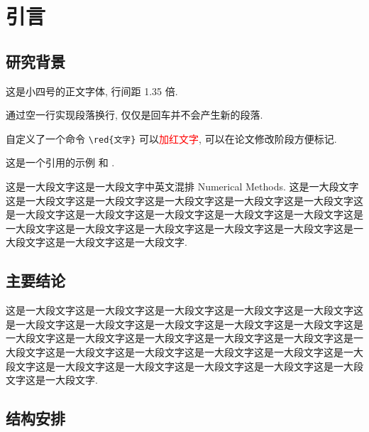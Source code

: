 \documentclass{shnuthesis}
\newcommand{\red}[1]{\textcolor{red}{#1}}
\begin{document}
    \maketoc[pagenumtoc]


	\clearpage  %

    \mainmatter



\chapter{引言}

\section{研究背景}
这是小四号的正文字体, 行间距 1.35 倍.
	
通过空一行实现段落换行, 仅仅是回车并不会产生新的段落.

自定义了一个命令 \verb|\red{文字}| 可以\red{加红文字}, 可以在论文修改阶段方便标记.

这是一个引用的示例 \cite{Adams2003}和 \cite{Shen1994,Tadmor2012,TreWei2014}.

这是一大段文字这是一大段文字中英文混排 Numerical Methods. 这是一大段文字这是一大段文字这是一大段文字这是一大段文字这是一大段文字这是一大段文字这是一大段文字这是一大段文字这是一大段文字这是一大段文字这是一大段文字这是一大段文字这是一大段文字这是一大段文字这是一大段文字这是一大段文字这是一大段文字这是一大段文字这是一大段文字.

\section{主要结论}

这是一大段文字这是一大段文字这是一大段文字这是一大段文字这是一大段文字这是一大段文字这是一大段文字这是一大段文字这是一大段文字这是一大段文字这是一大段文字这是一大段文字这是一大段文字这是一大段文字这是一大段文字这是一大段文字这是一大段文字这是一大段文字这是一大段文字这是一大段文字这是一大段文字这是一大段文字这是一大段文字这是一大段文字这是一大段文字这是一大段文字这是一大段文字.



\section{结构安排}
\end{document}
